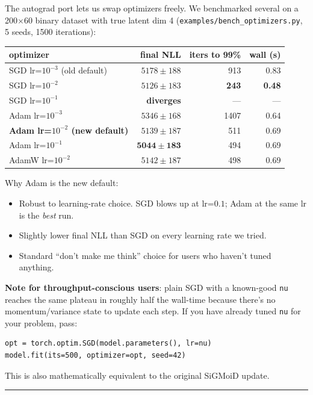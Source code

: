 \documentclass[11pt]{article}
\begin{document}
The autograd port lets us swap optimizers freely. We benchmarked
several on a 200$\times$60 binary dataset with true latent dim 4
(\texttt{examples/bench\_optimizers.py}, 5 seeds, 1500 iterations):

\begin{center}
\begin{tabular}{lrrr}
\hline
optimizer & final NLL & iters to 99\% & wall (s) \\
\hline
SGD lr=$10^{-3}$ (old default) & $5178 \pm 188$ & 913 & 0.83 \\
SGD lr=$10^{-2}$               & $5126 \pm 183$ & \textbf{243} & \textbf{0.48} \\
SGD lr=$10^{-1}$               & \textbf{diverges} & --- & --- \\
Adam lr=$10^{-3}$              & $5346 \pm 168$ & 1407 & 0.64 \\
\textbf{Adam lr=$10^{-2}$ (new default)} & $5139 \pm 187$ & 511 & 0.69 \\
Adam lr=$10^{-1}$              & $\mathbf{5044 \pm 183}$ & 494 & 0.69 \\
AdamW lr=$10^{-2}$             & $5142 \pm 187$ & 498 & 0.69 \\
\hline
\end{tabular}
\end{center}

Why Adam is the new default:
\begin{itemize}[leftmargin=*, itemsep=2pt]
  \item Robust to learning-rate choice. SGD blows up at lr=$0.1$; Adam at the same lr is the \emph{best} run.
  \item Slightly lower final NLL than SGD on every learning rate we tried.
  \item Standard ``don't make me think'' choice for users who haven't tuned anything.
\end{itemize}

\noindent \textbf{Note for throughput-conscious users}: plain SGD with a
known-good \texttt{nu} reaches the same plateau in roughly half the wall-time
because there's no momentum/variance state to update each step. If you have
already tuned \texttt{nu} for your problem, pass:
\begin{lstlisting}
opt = torch.optim.SGD(model.parameters(), lr=nu)
model.fit(its=500, optimizer=opt, seed=42)
\end{lstlisting}
This is also mathematically equivalent to the original SiGMoiD update.

\bigskip
\hrule
\bigskip
\end{document}
